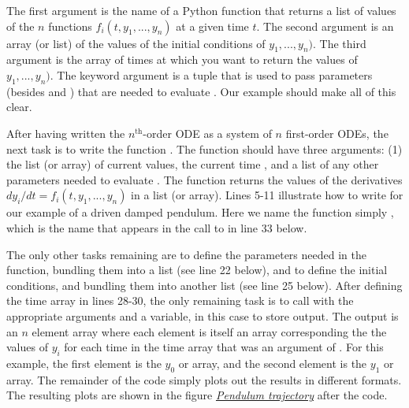 \documentclass[letterpaper,10pt,english]{sphinxmanual}
\begin{document}
The first argument  is the name of a Python function that returns a list of values of the $n$ functions $f_i(t, y_1, ..., y_n)$ at a given time $t$.  The second argument  is an array (or list) of the values of the initial conditions of $y_1, ..., y_n)$.  The third argument is the array of times at which you want  to return the values of $y_1, ..., y_n)$.  The keyword argument  is a tuple that is used to pass parameters (besides  and ) that are needed to evaluate .  Our example should make all of this clear.

After having written the $n^\mathrm{th}$-order ODE as a system of $n$ first-order ODEs, the next task is to write the function .  The function  should have three arguments: (1) the list (or array) of current  values, the current time , and a list of any other parameters  needed to evaluate .  The function  returns the values of the derivatives $dy_i/dt = f_i(t, y_1, ..., y_n)$ in a list (or array).  Lines 5-11 illustrate how to write  for our example of a driven damped pendulum.  Here we name the function simply , which is the name that appears in the call to  in line 33 below.

The only other tasks remaining are to define the parameters needed in the function, bundling them into a list (see line 22 below),  and to define the initial conditions, and bundling them into another list (see line 25 below).  After defining the time array in lines 28-30, the only remaining task is to call  with the appropriate arguments and a variable,  in this case to store output.  The output  is an $n$ element array where each element is itself an array corresponding the the values of $y_i$ for each time in the time  array that was an argument of .  For this example, the first element  is the $y_0$ or  array, and the second element  is the $y_1$ or  array.  The remainder of the code simply plots out the results in different formats.  The resulting plots are shown in the figure {\hyperref[chap9/chap9_scipy:fig-odepend]{\emph{Pendulum trajectory}}} after the code.
\end{document}
